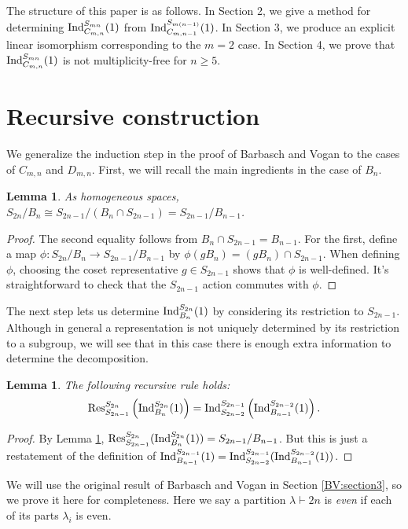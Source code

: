 \documentclass[12pt]{amsart}
\newtheorem{lemma}[theorem]{Lemma}
\numberwithin{theorem}{section}
\newcommand{\Ind}{\textup{Ind}}
\newcommand{\Res}{\textup{Res}}
\begin{document}
The structure of this paper is as follows. In Section 2, we give a method for determining $\Ind_{C_{m,n}}^{S_{mn}}(1)$ from $\Ind_{C_{m,n-1}}^{S_{m(n-1)}}(1)$. In Section 3, we produce an explicit linear isomorphism corresponding to the $m=2$ case.
In Section 4, we prove that $\Ind_{C_{m,n}}^{S_{mn}}(1)$ is not multiplicity-free for $n \ge 5$.

\section{Recursive construction}
We generalize the induction step in the proof of Barbasch and Vogan to the cases of $C_{m,n}$ and $D_{m,n}$.
First, we will recall the main ingredients in the case of $B_n$.

\begin{lemma}\label{BV:lemma1}
As homogeneous spaces, 
$S_{2n}/B_n \cong S_{2n-1}/(B_n \cap S_{2n-1}) = S_{2n-1}/B_{n-1}$.
\end{lemma}
\begin{proof}
The second equality follows from $B_n \cap S_{2n-1} = B_{n-1}$. For the first, define a map $\phi: S_{2n} / B_n \to S_{2n-1}/B_{n-1}$ by $\phi(gB_n) = (gB_n) \cap S_{2n-1}$. When defining $\phi$, choosing the coset representative $g \in S_{2n-1}$ shows that $\phi$ is well-defined. It's straightforward to check that the $S_{2n-1}$ action commutes with $\phi$.
\end{proof}

The next step lets us determine $\Ind_{B_n}^{S_{2n}}(1)$ by considering its restriction to $S_{2n-1}$. Although in general a representation is not uniquely determined by its restriction to a subgroup, we will see that in this case there is enough extra information to determine the decomposition.

\begin{lemma}\label{BV:lemma2}
The following recursive rule holds:
$$\Res_{S_{2n-1}}^{S_{2n}}\left(\Ind_{B_n}^{S_{2n}}(1)\right) = \Ind_{S_{2n-2}}^{S_{2n-1}}\left(\Ind_{B_{n-1}}^{S_{2n-2}}(1)\right).$$
\end{lemma}
\begin{proof}
By Lemma \ref{BV:lemma1}, $\Res_{S_{2n-1}}^{S_{2n}}(\Ind_{B_n}^{S_{2n}}(1)) = S_{2n-1}/B_{n-1}$. But this is just a restatement
of the definition of $ \Ind_{B_{n-1}}^{S_{2n-1}} (1) = \Ind_{S_{2n-2}}^{S_{2n-1}}(\Ind_{B_{n-1}}^{S_{2n-2}}(1))$.
\end{proof}

We will use the original result of Barbasch and Vogan in Section \ref{BV:section3}, so we prove it here for completeness. Here we say a partition $\lambda \vdash 2n$ is {\em even} if each of its parts $\lambda_i$ is even.
\end{document}
